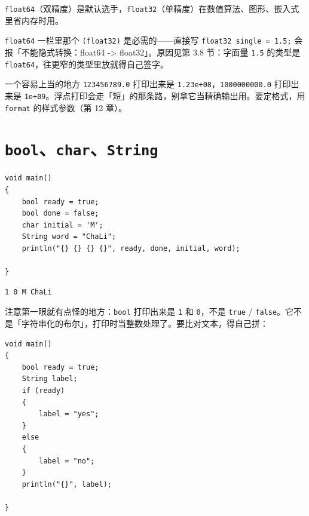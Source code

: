 \texttt{float64}（双精度）是默认选手，\texttt{float32}（单精度）在数值算法、图形、嵌入式里省内存时用。

\texttt{float64} 一栏里那个 \texttt{(\allowbreak{}float32)\allowbreak{}} 是必需的——直接写 \texttt{float32 single =\allowbreak{} 1.\allowbreak{}5;} 会报「不能隐式转换：float64 -> float32」。原因见第 3.8 节：字面量 \texttt{1.\allowbreak{}5} 的类型是\texttt{float64}，往更窄的类型里放就得自己签字。

\begin{tip}{一个容易上当的地方}
\texttt{123456789.\allowbreak{}0} 打印出来是 \texttt{1.\allowbreak{}23e+08}，\texttt{1000000000.\allowbreak{}0} 打印出来是 \texttt{1e+09}。浮点打印会走「短」的那条路，别拿它当精确输出用。要定格式，用 \texttt{format} 的样式参数（第 12 章）。
\end{tip}

\section{\texttt{bool}、\texttt{char}、\texttt{String}}

\par
\medskip
\begin{lstlisting}[style=chali]
void main()
{
    bool ready = true;
    bool done = false;
    char initial = 'M';
    String word = "ChaLi";
    println("{} {} {} {}", ready, done, initial, word);

}
\end{lstlisting}
\par
\medskip

\par
\medskip
\begin{lstlisting}[style=out]
1 0 M ChaLi
\end{lstlisting}
\par
\medskip

注意第一眼就有点怪的地方：\texttt{bool} 打印出来是 \texttt{1} 和 \texttt{0}，不是 \texttt{true} / \texttt{false}。它不是「字符串化的布尔」，打印时当整数处理了。要比对文本，得自己拼：

\par
\medskip
\begin{lstlisting}[style=chali]
void main()
{
    bool ready = true;
    String label;
    if (ready)
    {
        label = "yes";
    }
    else
    {
        label = "no";
    }
    println("{}", label);

}
\end{lstlisting}
\par
\medskip

